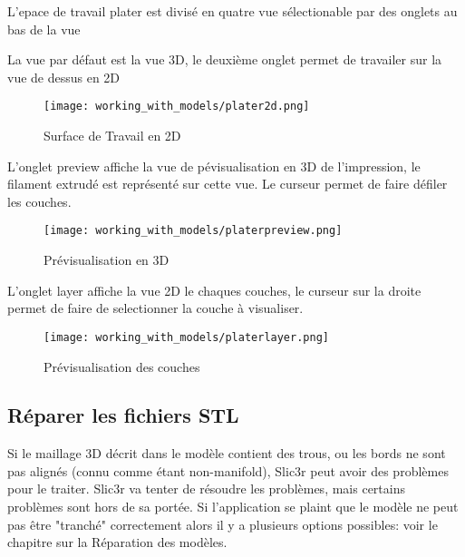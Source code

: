 L'epace de travail plater est divisé en quatre vue sélectionable par des onglets au bas de la vue

La vue par défaut est la vue 3D, le deuxième onglet permet de travailer sur la vue de dessus en 2D

\begin{figure}[H]
\centering
\texttt{[image: working\_with\_models/plater2d.png]}
\caption{Surface de Travail en 2D}
\label{fig:plater2d}
\end{figure}
L'onglet preview affiche la vue de pévisualisation en 3D de l'impression, le filament extrudé est représenté sur cette vue. Le curseur permet de faire d\'efiler les couches.

\begin{figure}[H]
\centering
\texttt{[image: working\_with\_models/platerpreview.png]}
\caption{Prévisualisation en 3D}
\label{fig:platerpreview}
\end{figure}
L'onglet layer affiche la vue 2D le chaques couches, le curseur sur la droite permet de faire de selectionner la couche \`a visualiser.

\begin{figure}[H]
\centering
\texttt{[image: working\_with\_models/platerlayer.png]}
\caption{Prévisualisation des couches}
\label{fig:platerlayer}
\end{figure}



\subsection{R\'eparer les fichiers STL} %
\label{sub:cleaning_stls}
Si le maillage 3D d\'ecrit dans le mod\`ele contient des trous, ou les bords ne sont pas align\'es (connu comme \'etant non-manifold), Slic3r peut avoir des probl\`emes pour le traiter. Slic3r va tenter de r\'esoudre les probl\`emes, mais certains probl\`emes sont hors de sa port\'ee. Si l'application se plaint que le mod\`ele ne peut pas \^etre "tranch\'e" correctement alors il y a plusieurs options possibles: voir le chapitre sur la R\'eparation des mod\`eles.

